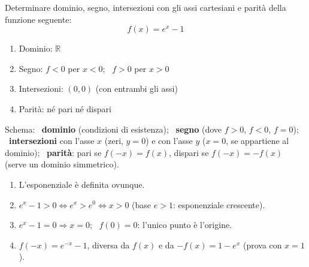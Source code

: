 \begin{question}[ID=1.8, subtitle={Studio di una funzione esponenziale}, difficulty=facile, tags={funzioni, studio di funzione, esponenziali}]
Determinare dominio, segno, intersezioni con gli assi cartesiani e parità della funzione seguente:
\begin{equation*}
    f(x)=e^x-1
\end{equation*}
\begin{solution}
\begin{enumerate}
    \item Dominio: $\mathbb{R}$
    \item Segno: $f<0$ per $x<0$; \ $f>0$ per $x>0$
    \item Intersezioni: $(0,0)$ (con entrambi gli assi)
    \item Parità: né pari né dispari
\end{enumerate}
\end{solution}
\begin{explanation}
Schema: \ \textbf{dominio} (condizioni di esistenza); \ \textbf{segno} (dove $f>0$, $f<0$, $f=0$); \ \textbf{intersezioni} con l'asse $x$ (zeri, $y=0$) e con l'asse $y$ ($x=0$, se appartiene al dominio); \ \textbf{parità}: pari se $f(-x)=f(x)$, dispari se $f(-x)=-f(x)$ (serve un dominio simmetrico).
\begin{enumerate}
    \item L'esponenziale è definita ovunque.
    \item $e^x-1>0 \iff e^x>e^0 \iff x>0$ (base $e>1$: esponenziale crescente).
    \item $e^x-1=0 \Rightarrow x=0$; \ $f(0)=0$: l'unico punto è l'origine.
    \item $f(-x)=e^{-x}-1$, diversa da $f(x)$ e da $-f(x)=1-e^x$ (prova con $x=1$).
\end{enumerate}
\end{explanation}
\end{question}


